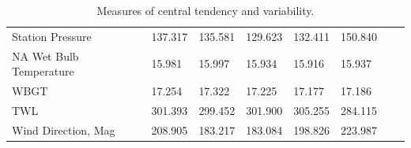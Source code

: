 \documentclass[a4paper,12pt]{article} %
\begin{document}
\begin{enumerate}
\begin{table}[H]
\begin{tabular}{llllllll}
Station Pressure             &137.317          &135.581                 &129.623             &132.411            & 150.840 \\
NA Wet Bulb Temperature             &15.981          &15.997                 &15.934             &15.916            & 15.937 \\
WBGT             &17.254          &17.322                     &17.225             &17.177            & 17.186 \\
TWL             &301.393        &299.452                     &301.900             &305.255            & 284.115 \\
Wind Direction, Mag                 & 208.905               & 183.217               & 183.084             & 198.826            & 223.987 

\end{tabular}
\caption{Measures of central tendency and variability.}
\label{my-label}
\end{table}

\end{enumerate}







\end{document}
